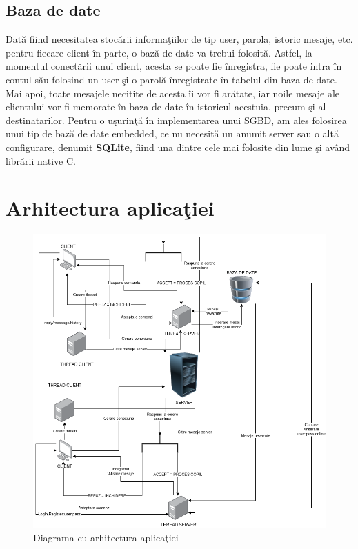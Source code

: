 \documentclass[runningheads]{llncs}
\begin{document}
\vspace{0.5cm}

\subsection{Baza de date}

Dat\u a fiind necesitatea stoc\u arii informa\c tiilor de tip user, parola, istoric mesaje, etc. pentru fiecare client \^ in parte, o baz\u a de date va trebui folosit\u a. Astfel, la momentul conect\u arii unui client, acesta se poate fie \^ inregistra, fie poate intra \^ in contul s\u au folosind un user \c si o parol\u a \^ inregistrate \^ in tabelul din baza de date. Mai apoi, toate mesajele necitite de acesta \^ ii vor fi ar\u atate, iar noile mesaje ale clientului vor fi memorate \^ in baza de date \^ in istoricul acestuia, precum \c si al destinatarilor.
\newline
Pentru o u\c surin\c t\u a \^ in implementarea unui SGBD, am ales folosirea unui tip de baz\u  a de date embedded, ce nu necesit\u a un anumit server sau o alt\u a configurare, denumit {\bf SQLite}, fiind una dintre cele mai folosite din lume \c si av\^ and libr\u arii native C.

\vspace{1cm}

\section{Arhitectura aplica\c tiei}

\begin{figure}
\includegraphics[width=\textwidth]{project.png}
\caption{Diagrama cu arhitectura aplica\c tiei} \label{fig1}
\end{figure}
\end{document}
